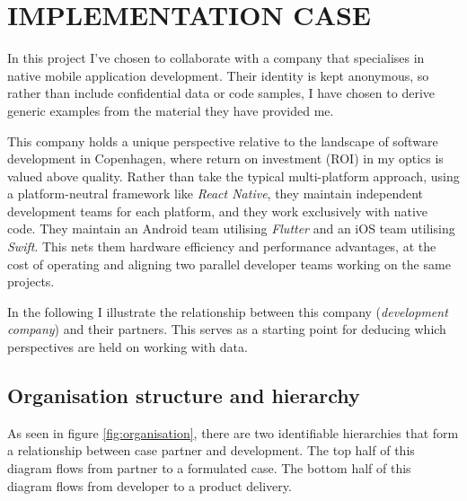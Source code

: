 \documentclass[../report.tex]{subfiles}
\begin{document}
\section{IMPLEMENTATION CASE} \label{sec:case}

In this project I've chosen to collaborate with a company that specialises in native mobile application development. Their identity is kept anonymous, so rather than include confidential data or code samples, I have chosen to derive generic examples from the material they have provided me.

This company holds a unique perspective relative to the landscape of software development in Copenhagen, where return on investment (ROI) in my optics is valued above quality. Rather than take the typical multi-platform approach, using a platform-neutral framework like \textit{React Native}, they maintain independent development teams for each platform, and they work exclusively with native code. They maintain an Android team utilising \textit{Flutter} and an iOS team utilising \textit{Swift}. This nets them hardware efficiency and performance advantages, at the cost of operating and aligning two parallel developer teams working on the same projects.

In the following I illustrate the relationship between this company (\textit{development company}) and their partners. This serves as a starting point for deducing which perspectives are held on working with data.


\subsection{Organisation structure and hierarchy}

As seen in figure \ref{fig:organisation}, there are two identifiable hierarchies that form a relationship between case partner and development. The top half of this diagram flows from partner to a formulated case. The bottom half of this diagram flows from developer to a product delivery.
\end{document}
